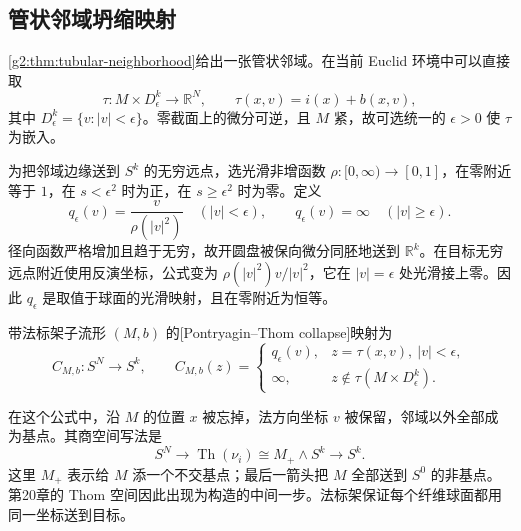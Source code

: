\subsection{管状邻域坍缩映射}
\label{g2:subsec:2302:02}
\cref{g2:thm:tubular-neighborhood}给出一张管状邻域。在当前 Euclid 环境中可以直接取
\[
	\tau:M\times D^k_\epsilon\longrightarrow\mathbb R^N,
	\qquad \tau(x,v)=i(x)+b(x,v),
\]
其中 \(D^k_\epsilon=\{v:|v|<\epsilon\}\)。零截面上的微分可逆，且 \(M\) 紧，故可选统一的 \(\epsilon>0\) 使 \(\tau\) 为嵌入。

为把邻域边缘送到 \(S^k\) 的无穷远点，选光滑非增函数 \(\rho:[0,\infty)\to[0,1]\)，在零附近等于 \(1\)，在 \(s<\epsilon^2\) 时为正，在 \(s\ge\epsilon^2\) 时为零。定义
\[
	q_\epsilon(v)=\frac{v}{\rho(|v|^2)}\quad(|v|<\epsilon),
	\qquad q_\epsilon(v)=\infty\quad(|v|\ge\epsilon).
\]
径向函数严格增加且趋于无穷，故开圆盘被保向微分同胚地送到 \(\mathbb R^k\)。在目标无穷远点附近使用反演坐标，公式变为 \(\rho(|v|^2)v/|v|^2\)，它在 \(|v|=\epsilon\) 处光滑接上零。因此 \(q_\epsilon\) 是取值于球面的光滑映射，且在零附近为恒等。

\begin{definition}\label{g2:def:pt-collapse}
	带法标架子流形 \((M,b)\) 的[Pontryagin--Thom collapse]映射为
	\begin{equation}\label{g2:eq:pt-collapse}
		C_{M,b}:S^N\longrightarrow S^k,\qquad
		C_{M,b}(z)=
		\begin{cases}
			q_\epsilon(v),&z=\tau(x,v),\ |v|<\epsilon,\\
			\infty,&z\notin\tau(M\times D^k_\epsilon).
		\end{cases}
	\end{equation}
\end{definition}

在这个公式中，沿 \(M\) 的位置 \(x\) 被忘掉，法方向坐标 \(v\) 被保留，邻域以外全部成为基点。其商空间写法是
\[
	S^N\longrightarrow\operatorname{Th}(\nu_i)
	\cong M_+\wedge S^k\longrightarrow S^k.
\]
这里 \(M_+\) 表示给 \(M\) 添一个不交基点；最后一箭头把 \(M\) 全部送到 \(S^0\) 的非基点。第20章的 Thom 空间因此出现为构造的中间一步。法标架保证每个纤维球面都用同一坐标送到目标。

